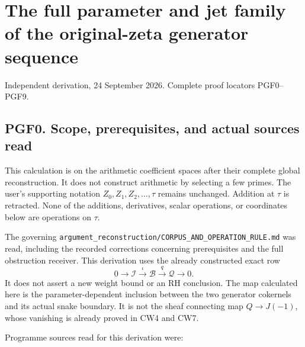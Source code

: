 \section{The full parameter and jet family of the original-zeta
generator
sequence}\label{the-full-parameter-and-jet-family-of-the-original-zeta-generator-sequence}

Independent derivation, 24 September 2026. Complete proof locators
PGF0--PGF9.

\subsection{PGF0. Scope, prerequisites, and actual sources
read}\label{pgf0.-scope-prerequisites-and-actual-sources-read}

This calculation is on the arithmetic coefficient spaces after their
complete global reconstruction. It does not construct arithmetic by
selecting a few primes. The user's supporting notation
\(Z_0,Z_1,Z_2,\ldots,\tau\) remains unchanged. Addition at \(\tau\) is
retracted. None of the additions, derivatives, scalar operations, or
coordinates below are operations on \(\tau\).

The governing
\nolinkurl{argument_reconstruction/CORPUS_AND_OPERATION_RULE.md} was
read, including the recorded corrections concerning prerequisites and
the full obstruction receiver. This derivation uses the already
constructed exact row \[
0\longrightarrow\mathcal I\xrightarrow{\iota}\mathcal B
\xrightarrow{q}\mathcal Q\longrightarrow0.
\tag{PGF0.1}
\] It does not assert a new weight bound or an RH conclusion. The map
calculated here is the parameter-dependent inclusion between the two
generator cokernels and its actual snake boundary. It is not the sheaf
connecting map \(Q\to J(-1)\), whose vanishing is already proved in CW4
and CW7.

Programme sources read for this derivation were:

